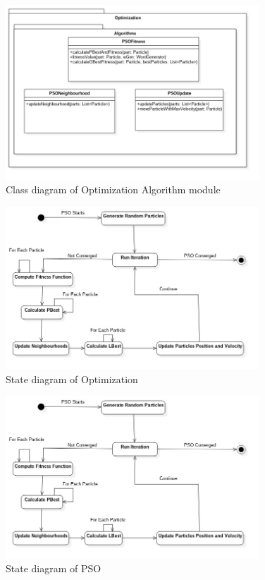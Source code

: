 \documentclass[runningheads, a4paper]{llncs}
\begin{document}
\begin{figure}[h]
\label{fig:class_opt_alg}
\caption{Class diagram of Optimization Algorithm module}
    \includegraphics[width=0.85\textwidth]{res/uml/classes/optimizationAlg.jpg}
\end{figure}

\begin{figure}[h]
\label{fig:state_opt}
\caption{State diagram of Optimization}
    \includegraphics[width=0.85\textwidth]{res/uml/states/optimizer.jpg}
\end{figure}

\begin{figure}[h]
\label{fig:state_pso}
\caption{State diagram of PSO}
    \includegraphics[width=0.85\textwidth]{res/uml/states/pso.jpg}
\end{figure}
\end{document}
